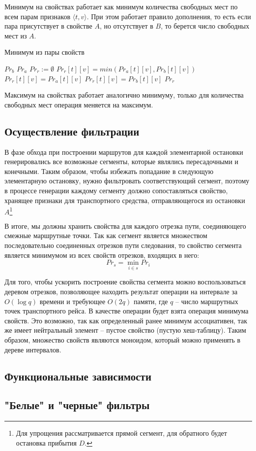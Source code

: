 Минимум на свойствах работает как минимум количества свободных мест по всем парам признаков $\langle t, v \rangle$. При этом работает правило дополнения, то есть если пара присутствует в свойстве $A$, но отсутствует в $B$, то берется число свободных мест из $A$.

\begin{algorithm}[!h]
	\caption{Минимум из пары свойств}\label{lst5}
	\begin{algorithmic}
			\State \Return $Pr_b$
		\EndIf
		\State \Return $Pr_a$
		\EndIf
		\State $Pr_r := \emptyset$ 
			\State $Pr_r[t][v] = min(Pr_a[t][v], Pr_b[t][v])$
		\EndFor
			\State $Pr_r[t][v] = Pr_a[t][v]$
		\EndFor
			\State $Pr_r[t][v] = Pr_b[t][v]$
		\EndFor
		\State \Return $Pr_r$
		\EndFunction
	\end{algorithmic}
\end{algorithm}

Максимум на свойствах работает аналогично минимуму, только для количества свободных мест операция меняется на максимум.

\subsection{Осуществление фильтрации}
В фазе обхода при построении маршрутов для каждой элементарной остановки генерировались все возможные сегменты, которые являлись пересадочными и конечными. Таким образом, чтобы избежать попадание в следующую элементарную остановку, нужно фильтровать соответствующий сегмент, поэтому в процессе генерации каждому сегменту должно сопоставляться свойство, хранящее признаки для транспортного средства, отправляющегося из остановки $A$\footnote{Для упрощения рассматривается прямой сегмент, для обратного будет остановка прибытия $D$.}

В итоге, мы должны хранить свойства для каждого отрезка пути, соединяющего смежные маршрутные точки. Так как сегмент является множеством последовательно соединенных отрезков пути следования, то свойство сегмента является минимумом из всех свойств отрезков, входящих в него:
\[
Pr_s=\min_{i \in s}{Pr_i}
\]

Для того, чтобы ускорить построение свойства сегмента можно воспользоваться деревом отрезков, позволяющее находить результат операции на интервале за $O(\log q)$ времени и требующее $O(2q)$ памяти, где $q$ -- число маршрутных точек транспортного рейса. В качестве операции будет взята операция минимума свойств. Это возможно, так как определенный ранее минимум ассоциативен, так же имеет нейтральный элемент -- пустое свойство (пустую хеш-таблицу). Таким образом, множество свойств являются моноидом, который можно применять в дереве интервалов.

\subsection{Функциональные зависимости}

\subsection{"Белые" и "черные" фильтры}

\chapterconclusion